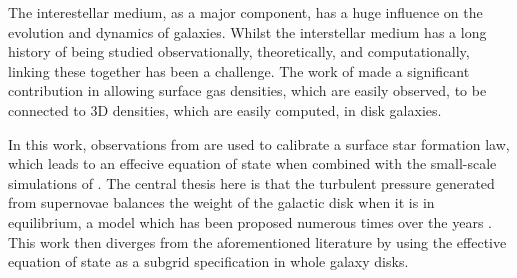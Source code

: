 The interestellar medium, as a major component, has a huge influence on the evolution and dynamics of galaxies.
Whilst the interstellar medium has a long history of being studied observationally, theoretically, and computationally, linking these together has been a challenge.
The work of \citet{schaye_star_2004} made a significant contribution in allowing surface gas densities, which are easily observed, to be connected to 3D densities, which are easily computed, in disk galaxies.

In this work, observations from \citet{bigiel_star_2008} are used to calibrate a surface star formation law, which leads to an effecive equation of state when combined with the small-scale simulations of \citet{martizzi_supernova_2015}.
The central thesis here is that the turbulent pressure generated from supernovae balances the weight of the galactic disk when it is in equilibrium, a model which has been proposed numerous times over the years \citep{silk_feedback_1997, ostriker_maximally_2011, faucher-giguere_feedback_2013, martizzi_supernova_2016}.
This work then diverges from the aforementioned literature by using the effective equation of state as a subgrid specification in whole galaxy disks.
